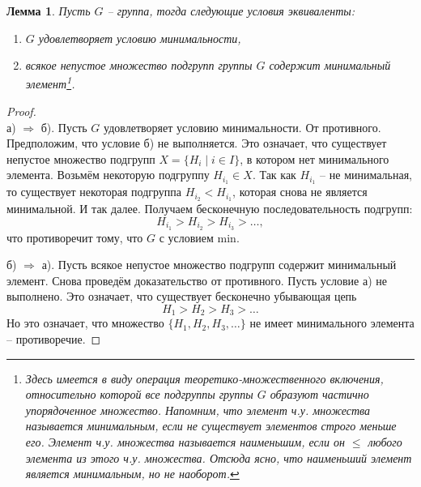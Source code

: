 \documentclass{article}
\newtheorem{lemma}{Лемма}[section]
\begin{document}
\begin{lemma} \label{vnqweruo}
    Пусть $G$ -- группа, тогда следующие условия эквиваленты:
    \begin{enumerate}
        \item[а)] $G$ удовлетворяет условию минимальности,
        
        \item[б)] всякое непустое множество подгрупп группы $G$ содержит минимальный элемент\footnote{Здесь имеется в виду операция теоретико-множественного включения, относительно которой все подгруппы группы $G$ образуют частично упорядоченное множество. Напомним, что элемент ч.у. множества называется \textit{минимальным}, если не существует элементов строго меньше его. Элемент ч.у. множества называется \textit{наименьшим}, если он $\leqslant$ любого элемента из этого ч.у. множества. Отсюда ясно, что наименьший элемент является минимальным, но не наоборот.}.
    \end{enumerate}
\end{lemma}
\begin{proof}
    \hfill \\
    
    а) $\Rightarrow$ б). Пусть $G$ удовлетворяет условию минимальности.
    От противного. Предположим, что условие б) не выполняется. Это означает, что существует непустое множество подгрупп $X = \{ H_i \mid i \in I \}$, в котором нет минимального элемента.
    Возьмём некоторую подгруппу $H_{i_1} \in X$. Так как $H_{i_1}$ -- не минимальная, то существует некоторая подгруппа $H_{i_2} < H_{i_1}$, которая снова не является минимальной. И так далее. Получаем бесконечную последовательность подгрупп:
    \[
        H_{i_1} > H_{i_2} > H_{i_3} > \ldots,
    \]
    что противоречит тому, что $G$ с условием min.

    б) $\Rightarrow$ а). Пусть всякое непустое множество подгрупп содержит минимальный элемент. Снова проведём доказательство от противного. 
    Пусть условие а) не выполнено. Это означает, что существует бесконечно убывающая цепь
    \[
        H_1 > H_2 > H_3 > \ldots
    \]
    Но это означает, что множество $\{ H_1, H_2, H_3, \ldots \}$ не имеет минимального элемента -- противоречие.
\end{proof}
\end{document}
